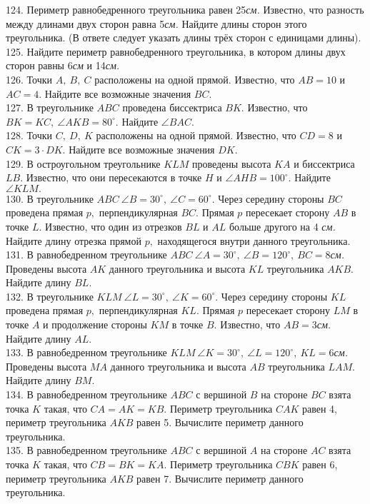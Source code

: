 124. Периметр равнобедренного треугольника равен 25{\it см.} Известно, что разность между длинами двух сторон равна 5{\it см.} Найдите длины сторон этого треугольника. (В ответе следует указать длины трёх сторон с единицами длины).\\
125. Найдите периметр равнобедренного треугольника, в котором длины двух сторон равны 6{\it см} и 14{\it см.}\\
126. Точки $A,\ B,\ C$ расположены на одной прямой. Известно, что $AB=10$ и $AC=4.$ Найдите все возможные значения $BC.$\\
127. В треугольнике $ABC$ проведена биссектриса $BK.$ Известно, что $BK=KC,\ \angle AKB=80^\circ.$ Найдите $\angle BAC.$\\
128. Точки $C,\ D,\ K$ расположены на одной прямой. Известно, что $CD=8$ и $CK=3\cdot DK.$ Найдите все возможные значения $DK.$\\
129. В остроугольном треугольнике $KLM$ проведены высота $KA$ и биссектриса $LB.$ Известно, что они пересекаются в точке $H$ и $\angle AHB=100^\circ.$ Найдите $\angle KLM.$\\
130. В треугольнике $ABC\ \angle B=30^\circ,\ \angle C=60^\circ.$ Через середину стороны $BC$ проведена прямая $p,$ перпендикулярная $BC.$ Прямая $p$ пересекает сторону $AB$ в точке $L.$ Известно, что один из отрезков $BL$ и $AL$ больше другого на 4 {\it см.} Найдите длину отрезка прямой $p,$ находящегося внутри данного треугольника.\\
131. В равнобедренном треугольнике $ABC\ \angle A=30^\circ,\ \angle B=120^\circ,\ BC=8${\it см.} Проведены высота $AK$ данного треугольника и высота $KL$ треугольника $AKB.$ Найдите длину $BL.$\\
132. В треугольнике $KLM\ \angle L=30^\circ,\ \angle K=60^\circ.$ Через середину стороны $KL$ проведена прямая $p,$ перпендикулярная $KL.$ Прямая $p$ пересекает сторону $LM$ в точке $A$ и продолжение стороны $KM$ в точке $B.$ Известно, что $AB=3${\it см.} Найдите длину $AL.$\\
133. В равнобедренном треугольнике $KLM\ \angle K=30^\circ,\ \angle L=120^\circ,\ KL=6${\it см.} Проведены высота $MA$ данного треугольника и высота $AB$ треугольника $LAM.$ Найдите длину $BM.$\\
134. В равнобедренном треугольнике $ABC$ с вершиной $B$ на стороне $BC$ взята точка $K$ такая, что $CA=AK=KB.$ Периметр треугольника $CAK$ равен 4, периметр треугольника $AKB$ равен 5. Вычислите периметр данного треугольника.\\
135. В равнобедренном треугольнике $ABC$ с вершиной $A$ на стороне $AC$ взята точка $K$ такая, что $CB=BK=KA.$ Периметр треугольника $CBK$ равен 6, периметр треугольника $AKB$ равен 7. Вычислите периметр данного треугольника.\\
